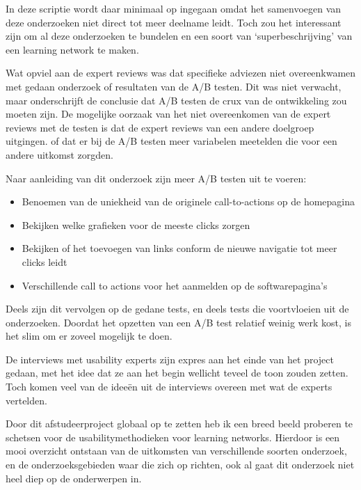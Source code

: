\documentclass[a4paper, 10pt, pdftex]{report}
\begin{document}
  In deze scriptie wordt daar minimaal op ingegaan omdat het samenvoegen van deze onderzoeken niet direct tot meer deelname leidt. Toch zou het interessant zijn om al deze onderzoeken te bundelen en een soort van `superbeschrijving' van een learning network te maken.

  Wat opviel aan de expert reviews was dat specifieke adviezen niet overeenkwamen met gedaan onderzoek of resultaten van de A/B testen. Dit was niet verwacht, maar onderschrijft de conclusie dat A/B testen de crux van de ontwikkeling zou moeten zijn. De mogelijke oorzaak van het niet overeenkomen van de expert reviews met de testen is dat de expert reviews van een andere doelgroep uitgingen. of dat er bij de A/B testen meer variabelen meetelden die voor een andere uitkomst zorgden.

  Naar aanleiding van dit onderzoek zijn meer A/B testen uit te voeren:
    \begin{itemize}
      \item Benoemen van de uniekheid van de originele call-to-actions op de homepagina
      \item Bekijken welke grafieken voor de meeste clicks zorgen
      \item Bekijken of het toevoegen van links conform de nieuwe navigatie tot meer clicks leidt
      \item Verschillende call to actions voor het aanmelden op de softwarepagina's
    \end{itemize}
  Deels zijn dit vervolgen op de gedane tests, en deels tests die voortvloeien uit de onderzoeken. Doordat het opzetten van een A/B test relatief weinig werk kost, is het slim om er zoveel mogelijk te doen.

  De interviews met usability experts zijn expres aan het einde van het project gedaan, met het idee dat ze aan het begin wellicht teveel de toon zouden zetten. Toch komen veel van de idee\"en uit de interviews overeen met wat de experts vertelden.

  Door dit afstudeerproject globaal op te zetten heb ik een breed beeld proberen te schetsen voor de usabilitymethodieken voor learning networks. Hierdoor is een mooi overzicht ontstaan van de uitkomsten van verschillende soorten onderzoek, en de onderzoeksgebieden waar die zich op richten, ook al gaat dit onderzoek niet heel diep op de onderwerpen in.

  \listoftables

  \listoffigures

  \newpage
  
  
  \newpage

  \appendix
  \addappheadtotoc
  
  
  
  
  
  
  
\end{document}
